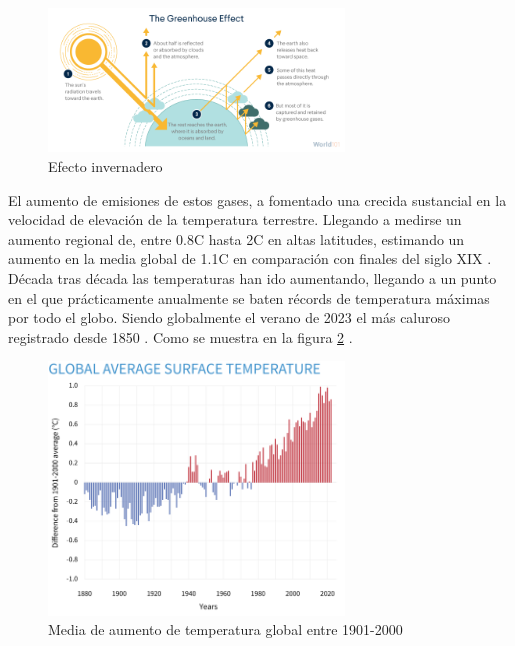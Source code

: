 \begin{figure} [H]
	\centering
	\includegraphics[width=0.7\textwidth]{fig/climate-change_greenhouse-effect_steps.png}
	\caption[Efecto invernadero]{Efecto invernadero \footnotemark}
	\label{fig:ej17}
\end{figure}

El aumento de emisiones de estos gases, a fomentado una crecida sustancial en la velocidad de elevación de la temperatura terrestre. Llegando a medirse un aumento regional de, entre 0.8\textdegree C hasta 2\textdegree C en altas latitudes, estimando un aumento en la media global de 1.1\textdegree C en comparación con finales del siglo XIX \cite{ruddiman2003anthropogenic}.\newline
\newline
Década tras década las temperaturas han ido aumentando, llegando a un punto en el que prácticamente anualmente se baten récords de temperatura máximas por todo el globo. Siendo globalmente el verano de 2023 el más caluroso registrado desde 1850 \cite{NCEIWeb}. Como se muestra en la figura \ref{fig:ej18} .

\begin{figure} [H]
	\centering
	\includegraphics[width=0.7\textwidth]{fig/ClimateDashboard-global-surface-temperature-graph-20230118-1400px.png}
	\caption[Media de aumento de temperatura global entre 1901-2000]{Media de aumento de temperatura global entre 1901-2000 \footnotemark}
	\label{fig:ej18}
\end{figure}

